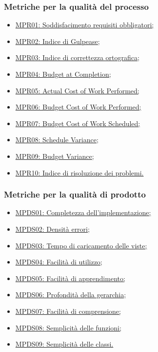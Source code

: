\subsubsection{Metriche per la qualità del processo}
\begin{itemize}
	\item  \hyperlink{MSoddRequisiti}{MPR01: Soddisfacimento requisiti obbligatori;}
	\item \hyperlink{MGulpease}{MPR02: Indice di Gulpease;}
	\item  \hyperlink{MOrtografia}{MPR03: Indice di correttezza ortografica;}
	\item  \hyperlink{MBC}{MPR04: Budget at Completion;}
	\item  \hyperlink{MACWP}{MPR05: Actual Cost of Work Performed;}
	\item  \hyperlink{MBCWP}{MPR06: Budget Cost of Work Performed;}
	\item  \hyperlink{MBCWS}{MPR07: Budget Cost of Work Scheduled;}
	\item  \hyperlink{MSV}{MPR08: Schedule Variance;}
	\item  \hyperlink{MBV}{MPR09: Budget Variance;}
	\item  \hyperlink{MProblemi}{MPR10: Indice di risoluzione dei problemi.} 
\end{itemize}

\subsubsection{Metriche per la qualità di prodotto}
\begin{itemize}
\item\hyperlink{MCImplementazione}{MPDS01: Completezza dell'implementazione;}
\item \hyperlink{MErrori}{MPDS02: Densità errori;}
\item\hyperlink{MCViste}{MPDS03: Tempo di caricamento delle viste;}
\item\hyperlink{MFUtilizzo}{MPDS04: Facilità di utilizzo;}
\item\hyperlink{MFApprendimento}{MPDS05: Facilità di apprendimento;}
\item \hyperlink{MPGerarchia}{MPDS06:  Profondità della gerarchia;}
\item \hyperlink{MSFComprensione}{MPDS07: Facilità di comprensione;}
\item \hyperlink{MSFunzioni}{MPDS08: Semplicità delle funzioni;}
\item \hyperlink{MSC}{MPDS09: Semplicità delle classi.}
\end{itemize}